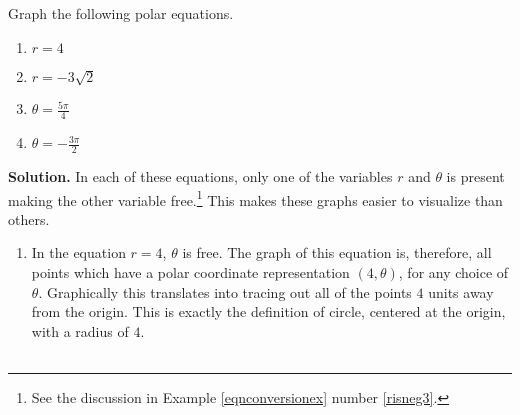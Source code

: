 \begin{ex} \label{rthetaconstant} Graph the following polar equations.

\begin{multicols}{4}

\begin{enumerate}

\item  $r = 4$

\item  $r = -3\sqrt{2}$

\item  $\theta = \frac{5\pi}{4}$

\item  $\theta = -\frac{3\pi}{2}$

\end{enumerate}

\end{multicols}

{\bf Solution.}  In each of these equations, only one of the variables $r$ and $\theta$ is present making the other  variable free.\footnote{See the discussion in Example \ref{eqnconversionex} number \ref{risneg3}.} This makes these graphs easier to visualize than others.

\begin{enumerate}

\item  In the equation $r=4$, $\theta$ is free.  The graph of this equation is, therefore,  all points which have a polar coordinate representation $(4,\theta)$, for any choice of $\theta$.  Graphically this translates into tracing out all of the points $4$ units away from the origin.  This is exactly the definition of circle, centered at the origin, with a radius of $4$.

\begin{center}

\begin{tabular}{cc}


\end{tabular}
\end{center}
\end{enumerate}
\end{ex}

